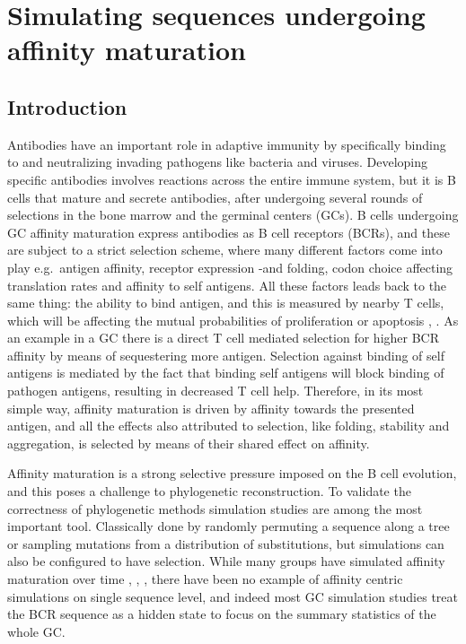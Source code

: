 \chapter{Simulating sequences undergoing affinity maturation}

\section{Introduction}
Antibodies have an important role in adaptive immunity by specifically binding to and neutralizing invading pathogens like bacteria and viruses.
Developing specific antibodies involves reactions across the entire immune system, but it is B cells that mature and secrete antibodies, after undergoing several rounds of selections in the bone marrow and the germinal centers (GCs).
B cells undergoing GC affinity maturation express antibodies as B cell receptors (BCRs), and these are subject to a strict selection scheme, where many different factors come into play e.g.\ antigen affinity, receptor expression -and folding, codon choice affecting translation rates and affinity to self antigens.
All these factors leads back to the same thing: the ability to bind antigen, and this is measured by nearby T cells, which will be affecting the mutual probabilities of proliferation or apoptosis \cite{Bannard_Cyster_2017}, \cite{victora2012germinal}.
As an example in a GC there is a direct T cell mediated selection for higher BCR affinity by means of sequestering more antigen.
Selection against binding of self antigens is mediated by the fact that binding self antigens will block binding of pathogen antigens, resulting in decreased T cell help.
Therefore, in its most simple way, affinity maturation is driven by affinity towards the presented antigen, and all the effects also attributed to selection, like folding, stability and aggregation, is selected by means of their shared effect on affinity.

Affinity maturation is a strong selective pressure imposed on the B cell evolution, and this poses a challenge to phylogenetic reconstruction.%
To validate the correctness of phylogenetic methods simulation studies are among the most important tool.
Classically done by randomly permuting a sequence along a tree or sampling mutations from a distribution of substitutions, but simulations can also be configured to have selection.
While many groups have simulated affinity maturation over time \cite{Reshetova_2017}, \cite{Balelli_2016}, \cite{Childs_Baskerville_Cobey_2015}, there have been no example of affinity centric simulations on single sequence level, and indeed most GC simulation studies treat the BCR sequence as a hidden state to focus on the summary statistics of the whole GC.

